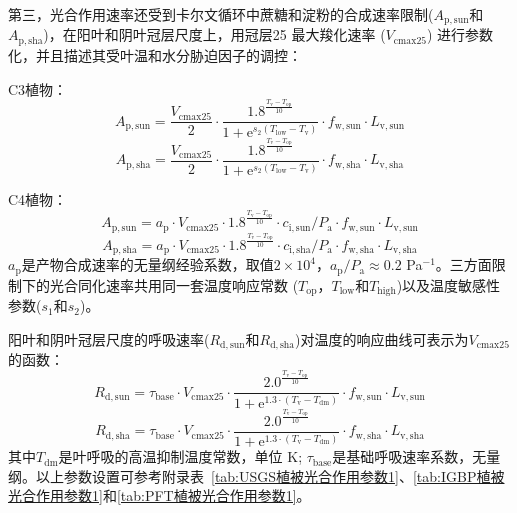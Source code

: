第三，光合作用速率还受到卡尔文循环中蔗糖和淀粉的合成速率限制($A_{\mathrm{p,sun}}$和$A_{\mathrm{p,sha}}$)，在阳叶和阴叶冠层尺度上，用冠层25 \textcelsius 最大羧化速率 ($V_{\mathrm{cmax25}}$) 进行参数化，并且描述其受叶温和水分胁迫因子的调控：

C3植物：
\begin{equation}\label{A_e_a_sun}
A_{\mathrm{p,sun}}=\frac{V_{\mathrm{cmax 25}}}{2} \cdot \frac{1.8^{\frac{T_{\mathrm{{v }}}-T_{\mathrm{o p}}}{10}}}{1+{\mathrm e}^{s_{\mathrm{2}}\left(T_{\mathrm{{low }}}-T_{\mathrm{{v }}}\right)}} \cdot f_{\mathrm{w,sun}} \cdot L_{\mathrm{v,sun}}
\end{equation}
\begin{equation}\label{A_e_a_sha}
A_{\mathrm{p,sha}}=\frac{V_{\mathrm{cmax 25}}}{2} \cdot \frac{1.8^{\frac{T_{\mathrm{{v }}}-T_{\mathrm{o p}}}{10}}}{1+{\mathrm e}^{s_{\mathrm{2}}\left(T_{\mathrm{{low }}}-T_{\mathrm{{v }}}\right)}} \cdot f_{\mathrm{w,sha}} \cdot L_{\mathrm{v,sha}}
\end{equation}

C4植物：
\begin{equation}\label{A_e_b_sun}
A_{\mathrm{p,sun}}=a_{\mathrm{p}} \cdot V_{\mathrm{cmax 25}} \cdot 1.8^{\frac{T_{\mathrm{{v }}}-T_{\mathrm{op}}}{10}} \cdot c_{\mathrm{i,sun}}/P_{\mathrm {a}} \cdot f_{\mathrm{w,sun}} \cdot L_{\mathrm{v,sun}}
\end{equation}
\begin{equation}\label{A_e_b_sha}
A_{\mathrm{p,sha}}=a_{\mathrm{p}} \cdot V_{\mathrm{cmax 25}} \cdot 1.8^{\frac{T_{\mathrm{{v }}}-T_{\mathrm{op}}}{10}} \cdot c_{\mathrm{i,sha}}/P_{\mathrm {a}} \cdot f_{\mathrm{w,sha}} \cdot L_{\mathrm{v,sha}}
\end{equation}
$a_{\mathrm{p}}$是产物合成速率的无量纲经验系数，取值$2\times10^4$，$a_{\mathrm{p}}/P_{\mathrm {a}}\approx 0.2$ Pa$^{-1}$。三方面限制下的光合同化速率共用同一套温度响应常数 ($T_{\mathrm{op}}$，$T_{\mathrm{low}}$和$T_{\mathrm{high}}$)以及温度敏感性参数($s_1$和$s_2$)。


阳叶和阴叶冠层尺度的呼吸速率($R_{\mathrm{d,sun}}$和$R_{\mathrm{d,sha}}$)对温度的响应曲线可表示为$V_{\mathrm{cmax25}}$的函数：
\begin{equation}\label{R_d1_sun}
R_{\mathrm{d,sun}}=\tau_{\mathrm{{base }}} \cdot V_{\mathrm{cmax 25}} \cdot \frac{2.0^{\frac{T_{\mathrm{v}}-T_{\mathrm{op}}}{10}}}{1+{\mathrm e}^{1.3 \cdot\left(T_{\mathrm{v}}-T_{\mathrm{d m}}\right)}} \cdot f_{\mathrm{w,sun}} \cdot L_{\mathrm{v,sun}}
\end{equation}
\begin{equation}\label{R_d1_sha}
R_{\mathrm{d,sha}}=\tau_{\mathrm{{base }}} \cdot V_{\mathrm{cmax 25}} \cdot \frac{2.0^{\frac{T_{\mathrm{v}}-T_{\mathrm{op}}}{10}}}{1+{\mathrm e}^{1.3 \cdot\left(T_{\mathrm{v}}-T_{\mathrm{d m}}\right)}} \cdot f_{\mathrm{w,sha}} \cdot L_{\mathrm{v,sha}}
\end{equation}
其中$T_{\mathrm{dm}}$是叶呼吸的高温抑制温度常数，单位 K; $\tau_{\mathrm{base}}$是基础呼吸速率系数，无量纲。以上参数设置可参考附录表~\ref{tab:USGS植被光合作用参数1}、\ref{tab:IGBP植被光合作用参数1}和\ref{tab:PFT植被光合作用参数1}。

